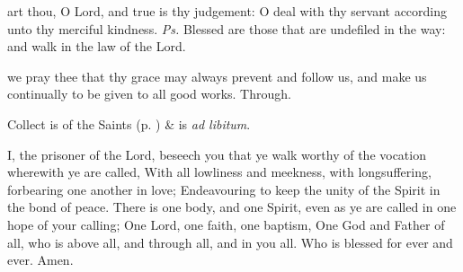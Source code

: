 


\properantiphonfix

\introit
{} art thou, O Lord, and true is thy judgement: O deal with thy servant according unto thy merciful kindness. \textit{Ps.} Blessed are those that are undefiled in the way: and walk in the law of the Lord.

\vspace{-1ex}

\collect
{} we pray thee that thy grace may always prevent and follow us, and make us continually to be given to all good works. Through.
\begin{rubric}
     Collect is of the Saints (p. \pageref{SPSaints}) \&  is \emph{ad libitum}.
\end{rubric}

\vspace{-2ex}

 I, the prisoner of the Lord, beseech you that ye walk worthy of the vocation wherewith ye are called, With all lowliness and meekness, with longsuffering, forbearing one another in love; Endeavouring to keep the unity of the Spirit in the bond of peace. There is one body, and one Spirit, even as ye are called in one hope of your calling; One Lord, one faith, one baptism, One God and Father of all, who is above all, and through all, and in you all. Who is blessed for ever and ever. Amen.




